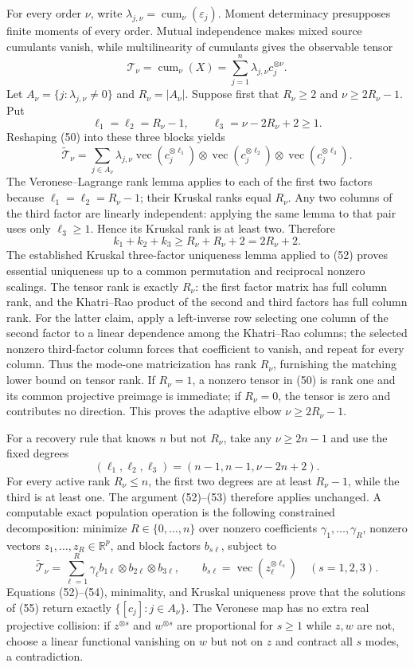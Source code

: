 For every order \(\nu\), write \(\lambda_{j,\nu}=\operatorname{cum}_\nu(\varepsilon_j)\). Moment determinacy presupposes finite moments of every order. Mutual independence makes mixed source cumulants vanish, while multilinearity of cumulants gives the observable tensor
\[
 \mathcal T_\nu=\operatorname{cum}_\nu(X)
 =\sum_{j=1}^n\lambda_{j,\nu}c_j^{\otimes\nu}. \tag{50}
\]
Let \(A_\nu=\{j:\lambda_{j,\nu}\ne0\}\) and \(R_\nu=|A_\nu|\). Suppose first that \(R_\nu\ge2\) and \(\nu\ge2R_\nu-1\). Put
\[
 \ell_1=\ell_2=R_\nu-1,
 \qquad
 \ell_3=\nu-2R_\nu+2\ge1. \tag{51}
\]
Reshaping (50) into these three blocks yields
\[
 \widetilde{\mathcal T}_\nu
 =\sum_{j\in A_\nu}\lambda_{j,\nu}
 \operatorname{vec}(c_j^{\otimes\ell_1})\otimes
 \operatorname{vec}(c_j^{\otimes\ell_2})\otimes
 \operatorname{vec}(c_j^{\otimes\ell_3}). \tag{52}
\]
The Veronese--Lagrange rank lemma applies to each of the first two factors because \(\ell_1=\ell_2=R_\nu-1\); their Kruskal ranks equal \(R_\nu\). Any two columns of the third factor are linearly independent: applying the same lemma to that pair uses only \(\ell_3\ge1\). Hence its Kruskal rank is at least two. Therefore
\[
 k_1+k_2+k_3\ge R_\nu+R_\nu+2=2R_\nu+2. \tag{53}
\]
The established Kruskal three-factor uniqueness lemma applied to (52) proves essential uniqueness up to a common permutation and reciprocal nonzero scalings. The tensor rank is exactly \(R_\nu\): the first factor matrix has full column rank, and the Khatri--Rao product of the second and third factors has full column rank. For the latter claim, apply a left-inverse row selecting one column of the second factor to a linear dependence among the Khatri--Rao columns; the selected nonzero third-factor column forces that coefficient to vanish, and repeat for every column. Thus the mode-one matricization has rank \(R_\nu\), furnishing the matching lower bound on tensor rank. If \(R_\nu=1\), a nonzero tensor in (50) is rank one and its common projective preimage is immediate; if \(R_\nu=0\), the tensor is zero and contributes no direction. This proves the adaptive elbow \(\nu\ge2R_\nu-1\).

For a recovery rule that knows \(n\) but not \(R_\nu\), take any \(\nu\ge2n-1\) and use the fixed degrees
\[
 (\ell_1,\ell_2,\ell_3)=(n-1,n-1,\nu-2n+2). \tag{54}
\]
For every active rank \(R_\nu\le n\), the first two degrees are at least \(R_\nu-1\), while the third is at least one. The argument (52)--(53) therefore applies unchanged. A computable exact population operation is the following constrained decomposition: minimize \(R\in\{0,\ldots,n\}\) over nonzero coefficients \(\gamma_1,\ldots,\gamma_R\), nonzero vectors \(z_1,\ldots,z_R\in\mathbb R^p\), and block factors \(b_{s\ell}\), subject to
\[
 \widetilde{\mathcal T}_\nu
 =\sum_{\ell=1}^R\gamma_\ell b_{1\ell}\otimes b_{2\ell}\otimes b_{3\ell},
 \qquad
 b_{s\ell}=\operatorname{vec}(z_\ell^{\otimes\ell_s})
 \quad(s=1,2,3). \tag{55}
\]
Equations (52)--(54), minimality, and Kruskal uniqueness prove that the solutions of (55) return exactly \(\{[c_j]:j\in A_\nu\}\). The Veronese map has no extra real projective collision: if \(z^{\otimes s}\) and \(w^{\otimes s}\) are proportional for \(s\ge1\) while \(z,w\) are not, choose a linear functional vanishing on \(w\) but not on \(z\) and contract all \(s\) modes, a contradiction.

